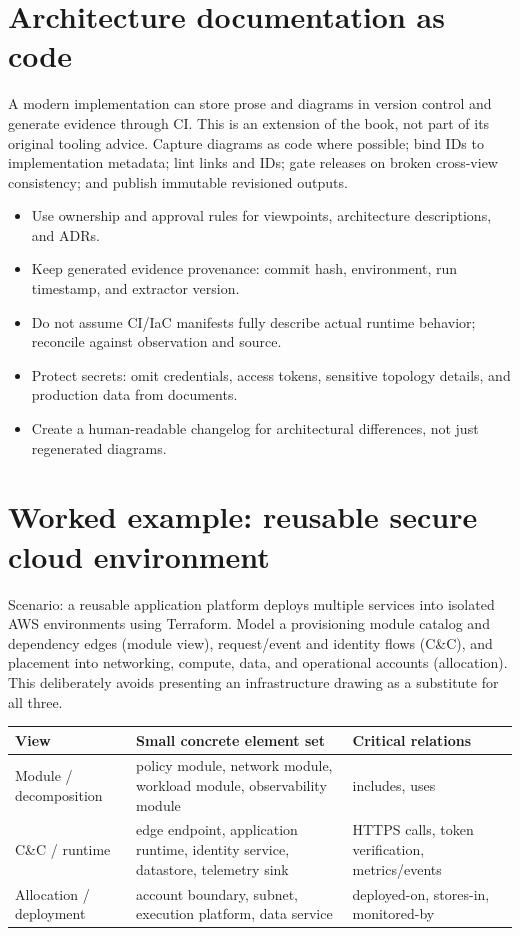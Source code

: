 \documentclass[10pt,letterpaper]{article}
\begin{document}
\section{Architecture documentation as code}
A modern implementation can store prose and diagrams in version control and generate evidence through CI. This is an extension of the book, not part of its original tooling advice. Capture diagrams as code where possible; bind IDs to implementation metadata; lint links and IDs; gate releases on broken cross-view consistency; and publish immutable revisioned outputs.

\begin{itemize}
\item Use ownership and approval rules for viewpoints, architecture descriptions, and ADRs.
\item Keep generated evidence provenance: commit hash, environment, run timestamp, and extractor version.
\item Do not assume CI/IaC manifests fully describe actual runtime behavior; reconcile against observation and source.
\item Protect secrets: omit credentials, access tokens, sensitive topology details, and production data from documents.
\item Create a human-readable changelog for architectural differences, not just regenerated diagrams.
\end{itemize}
\section{Worked example: reusable secure cloud environment}
Scenario: a reusable application platform deploys multiple services into isolated AWS environments using Terraform. Model a provisioning module catalog and dependency edges (module view), request/event and identity flows (C\&C), and placement into networking, compute, data, and operational accounts (allocation). This deliberately avoids presenting an infrastructure drawing as a substitute for all three.

\small
\begin{tabularx}{\linewidth}{@{}YYY@{}}
\toprule
\textbf{View} & \textbf{Small concrete element set} & \textbf{Critical relations} \\
\midrule
Module / decomposition & policy module, network module, workload module, observability module & includes, uses \\
C\&C / runtime & edge endpoint, application runtime, identity service, datastore, telemetry sink & HTTPS calls, token verification, metrics/events \\
Allocation / deployment & account boundary, subnet, execution platform, data service & deployed-on, stores-in, monitored-by \\
\bottomrule
\end{tabularx}
\normalsize
\end{document}
